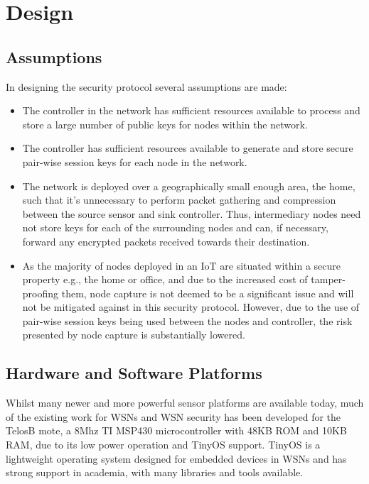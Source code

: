 \documentclass[conference]{./sty/IEEEtran}
\begin{document}
\section{Design} %
\label{sec:design}
\subsection{Assumptions} %
\label{sub:assumptions}
In designing the security protocol several assumptions are made:
\begin{itemize}
  \item The controller in the network has sufficient resources available to process and store a large number of public keys for nodes within the network.
  \item The controller has sufficient resources available to generate and store secure pair-wise session keys for each node in the network.  
  \item The network is deployed over a geographically small enough area, the home, such that it's unnecessary to perform packet gathering and compression between the source sensor and sink controller. Thus, intermediary nodes need not store keys for each of the surrounding nodes and can, if necessary, forward any encrypted packets received towards their destination.
  \item As the majority of nodes deployed in an IoT are situated within a secure property e.g., the home or office, and due to the increased cost of tamper-proofing them, node capture is not deemed to be a significant issue and will not be mitigated against in this security protocol. However, due to the use of pair-wise session keys being used between the nodes and controller, the risk presented by node capture is substantially lowered.
\end{itemize}

\subsection{Hardware and Software Platforms} %
\label{sec:hardware_and_software_platforms}
Whilst many newer and more powerful sensor platforms are available today, much of the existing work for WSNs and WSN security has been developed for the TelosB mote, a 8Mhz TI MSP430 microcontroller with 48KB ROM and 10KB RAM, due to its low power operation and TinyOS support. TinyOS is a lightweight operating system designed for embedded devices in WSNs and has strong support in academia, with many libraries and tools available. 
\end{document}
